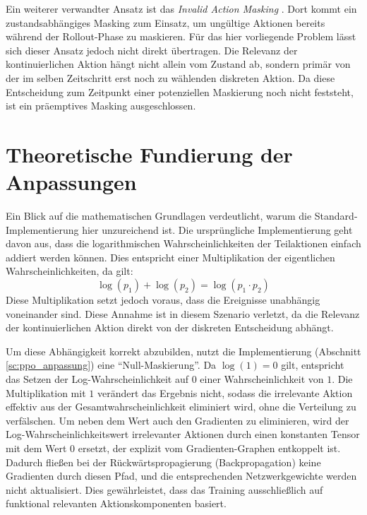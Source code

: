Ein weiterer verwandter Ansatz ist das \emph{Invalid Action Masking} \cite{invalid_Action_Masking}. Dort kommt ein zustandsabhängiges Masking zum Einsatz, um ungültige Aktionen bereits während der Rollout\hyp{}Phase zu maskieren. Für das hier vorliegende Problem lässt sich dieser Ansatz jedoch nicht direkt übertragen. Die Relevanz der kontinuierlichen Aktion hängt nicht allein vom Zustand ab, sondern primär von der im selben Zeitschritt erst noch zu wählenden diskreten Aktion. Da diese Entscheidung zum Zeitpunkt einer potenziellen Maskierung noch nicht feststeht, ist ein präemptives Masking ausgeschlossen.

\section{Theoretische Fundierung der Anpassungen}

Ein Blick auf die mathematischen Grundlagen verdeutlicht, warum die Standard\hyp{}Implementierung hier unzureichend ist. Die ursprüngliche Implementierung geht davon aus, dass die logarithmischen Wahrscheinlichkeiten der Teilaktionen einfach addiert werden können. Dies entspricht einer Multiplikation der eigentlichen Wahrscheinlichkeiten, da gilt:
\begin{equation*}
\log(p_1) + \log(p_2) = \log(p_1 \cdot p_2)
\end{equation*}
Diese Multiplikation setzt jedoch voraus, dass die Ereignisse unabhängig voneinander sind. Diese Annahme ist in diesem Szenario verletzt, da die Relevanz der kontinuierlichen Aktion direkt von der diskreten Entscheidung abhängt.
\medskip

Um diese Abhängigkeit korrekt abzubilden, nutzt die Implementierung (Abschnitt \ref{sc:ppo_anpassung}) eine \enquote{Null-Maskierung}. 
Da $\log(1) = 0$ gilt, entspricht das Setzen der Log\hyp{}Wahrscheinlichkeit auf $0$ einer Wahrscheinlichkeit von $1$. Die Multiplikation mit $1$ verändert das Ergebnis nicht, sodass die irrelevante Aktion effektiv aus der Gesamtwahrscheinlichkeit eliminiert wird, ohne die Verteilung zu verfälschen.
Um neben dem Wert auch den Gradienten zu eliminieren, wird der Log\hyp{}Wahrscheinlichkeitswert irrelevanter Aktionen durch einen konstanten Tensor mit dem Wert $0$ ersetzt, der explizit vom Gradienten\hyp{}Graphen entkoppelt ist. Dadurch fließen bei der Rückwärtspropagierung (Backpropagation) keine Gradienten durch diesen Pfad, und die entsprechenden Netzwerkgewichte werden nicht aktualisiert. Dies gewährleistet, dass das Training ausschließlich auf funktional relevanten Aktionskomponenten basiert.
\medskip

